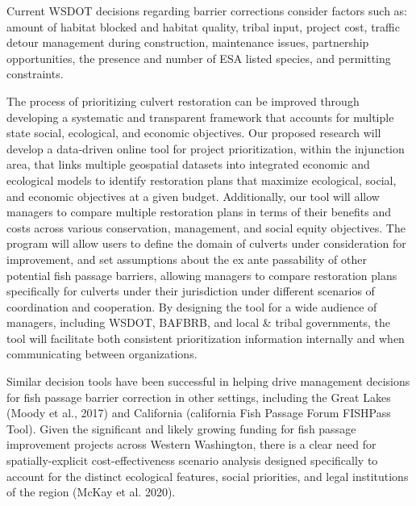 \documentclass[12pt]{elsarticle}
\begin{document}
Current WSDOT decisions regarding barrier corrections consider factors such as: amount of habitat blocked and habitat quality, tribal input, project cost, traffic detour management during construction, maintenance issues, partnership opportunities, the presence and number of ESA listed species, and permitting constraints. %

The process of prioritizing culvert restoration can be improved through developing a systematic and transparent framework that accounts for multiple state social, ecological, and economic objectives. Our proposed research will develop a data-driven online tool for project prioritization, within the injunction area, that links multiple geospatial datasets into integrated economic and ecological models to identify restoration plans that maximize ecological, social, and economic objectives at a given budget. Additionally, our tool will allow managers to compare multiple restoration plans in terms of their benefits and costs across various conservation, management, and social equity objectives. The program will allow users to define the domain of culverts under consideration for improvement, and set assumptions about the ex ante passability of other potential fish passage barriers, allowing managers to compare restoration plans specifically for culverts under their jurisdiction under different scenarios of coordination and cooperation. By designing the tool for a wide audience of managers, including WSDOT, BAFBRB, and local & tribal governments, the tool will facilitate both consistent prioritization information internally and when communicating between organizations. 

Similar decision tools have been successful in helping drive management decisions for fish passage barrier correction in other settings, including the Great Lakes (Moody et al., 2017) and California (california Fish Passage Forum FISHPass Tool). Given the significant and likely growing funding for fish passage improvement projects across Western Washington, there is a clear need for spatially-explicit cost-effectiveness scenario analysis designed specifically to account for the distinct ecological features, social priorities, and legal institutions of the region (McKay et al. 2020).
\end{document}
